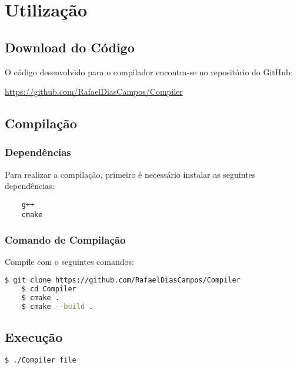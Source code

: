 \chapter{Utilização}
\label{cap:utilizacao}

\section{Download do Código}

O código desenvolvido para o compilador encontra-se no repositório do GitHub:

\href{https://github.com/RafaelDiasCampos/Compiler}{https://github.com/RafaelDiasCampos/Compiler}

\section{Compilação}

\subsection{Dependências}
Para realizar a compilação, primeiro é necessário instalar as seguintes dependências:

    \begin{lstlisting}
    g++
    cmake
    \end{lstlisting}

\subsection{Comando de Compilação}

Compile com o seguintes comandos:

    \begin{lstlisting}[language=bash]
    $ git clone https://github.com/RafaelDiasCampos/Compiler
    $ cd Compiler
    $ cmake .
    $ cmake --build .
    \end{lstlisting}

\section{Execução}

    \begin{lstlisting}[language=bash]
    $ ./Compiler file
    \end{lstlisting}